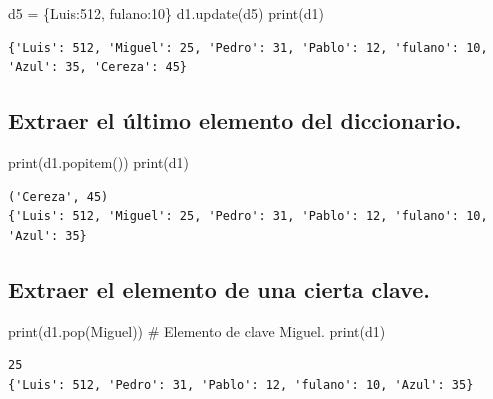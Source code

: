 \documentclass[
  spanish,
  letterpaper,
]{scrbook}
\newenvironment{Shaded}{\begin{snugshade}}{\end{snugshade}}
\newcommand{\BuiltInTok}[1]{\textcolor[rgb]{0.00,0.23,0.31}{#1}}
\newcommand{\CommentTok}[1]{\textcolor[rgb]{0.37,0.37,0.37}{#1}}
\newcommand{\DecValTok}[1]{\textcolor[rgb]{0.68,0.00,0.00}{#1}}
\newcommand{\NormalTok}[1]{\textcolor[rgb]{0.00,0.23,0.31}{#1}}
\newcommand{\OperatorTok}[1]{\textcolor[rgb]{0.37,0.37,0.37}{#1}}
\newcommand{\StringTok}[1]{\textcolor[rgb]{0.13,0.47,0.30}{#1}}
\theoremstyle{definition}
\theoremstyle{remark}
\begin{document}
\begin{Shaded}
\begin{Highlighting}[]
\NormalTok{d5 }\OperatorTok{=}\NormalTok{ \{}\StringTok{\textquotesingle{}Luis\textquotesingle{}}\NormalTok{:}\DecValTok{512}\NormalTok{, }\StringTok{\textquotesingle{}fulano\textquotesingle{}}\NormalTok{:}\DecValTok{10}\NormalTok{\}}
\NormalTok{d1.update(d5)}
\BuiltInTok{print}\NormalTok{(d1)}
\end{Highlighting}
\end{Shaded}

\begin{verbatim}
{'Luis': 512, 'Miguel': 25, 'Pedro': 31, 'Pablo': 12, 'fulano': 10, 'Azul': 35, 'Cereza': 45}
\end{verbatim}

\subsection{Extraer el último elemento del
diccionario.}\label{extraer-el-uxfaltimo-elemento-del-diccionario.}

\begin{Shaded}
\begin{Highlighting}[]
\BuiltInTok{print}\NormalTok{(d1.popitem()) }
\BuiltInTok{print}\NormalTok{(d1)}
\end{Highlighting}
\end{Shaded}

\begin{verbatim}
('Cereza', 45)
{'Luis': 512, 'Miguel': 25, 'Pedro': 31, 'Pablo': 12, 'fulano': 10, 'Azul': 35}
\end{verbatim}

\subsection{Extraer el elemento de una cierta
clave.}\label{extraer-el-elemento-de-una-cierta-clave.}

\begin{Shaded}
\begin{Highlighting}[]
\BuiltInTok{print}\NormalTok{(d1.pop(}\StringTok{\textquotesingle{}Miguel\textquotesingle{}}\NormalTok{)) }\CommentTok{\# Elemento de clave \textasciigrave{}\textquotesingle{}Miguel\textquotesingle{}\textasciigrave{}.}
\BuiltInTok{print}\NormalTok{(d1)}
\end{Highlighting}
\end{Shaded}

\begin{verbatim}
25
{'Luis': 512, 'Pedro': 31, 'Pablo': 12, 'fulano': 10, 'Azul': 35}
\end{verbatim}
\end{document}
